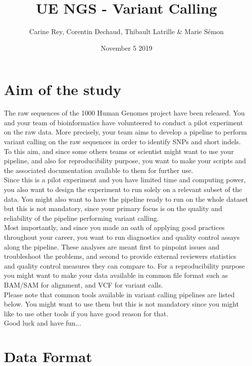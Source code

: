 \documentclass[8pt]{article}
\title{
UE NGS - Variant Calling\\
}
\author{Carine Rey, Corentin Dechaud, Thibault Latrille \& Marie Sémon }
\date{November 5 2019}
\begin{document}
\maketitle
\tableofcontents

\section{Aim of the study}

The raw sequences of the 1000 Human Genomes project have been released. You and your team of bioinformatics have volunteered to conduct a pilot experiment on the raw data. More precisely, your team aims to develop a pipeline to perform variant calling on the raw sequences in order to identify SNPs and short indels. To this aim, and since some others teams or scientist might want to use your pipeline, and also for reproducibility purpose, you want to make your scripts and the associated documentation available to them for further use. \\

Since this is a pilot experiment and you have limited time and computing power, you also want to design the experiment to run solely on a relevant subset of the data. You might also want to have the pipeline ready to run on the whole dataset but this is not mandatory, since your primary focus is on the quality and reliability of the pipeline performing variant calling.\\

Most importantly, and since you made an oath of applying good practices throughout your career, you want to run diagnostics and quality control assays along the pipeline. These analyses are meant first to pinpoint issues and troubleshoot the problems, and second to provide external reviewers statistics and quality control measures they can compare to. For a reproducibility purpose you might want to make your data available in common file format such as BAM/SAM for alignment, and VCF for variant calls. \\

Please note that common tools available in variant calling pipelines are listed below. You might want to use them but this is not mandatory since you might like to use other tools if you have good reason for that.\\

Good luck and have fun...

\section{Data Format}
\end{document}
